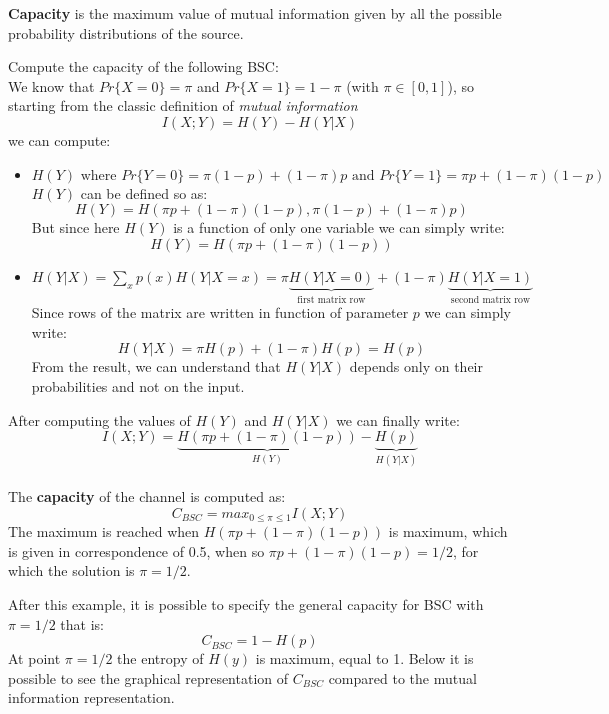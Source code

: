 \textbf{Capacity} is the maximum value of mutual information given by all the possible probability distributions of the source. 
\begin{exmp}
	Compute the capacity of the following BSC:\\
	We know that $Pr\{X=0\} = \pi$ and $Pr\{X=1\} = 1-\pi$ (with $\pi \in [0,1]$), so starting from the classic definition of \textit{mutual information} $$I(X;Y) = H(Y)-H(Y|X)$$ we can compute:
	\begin{itemize}
		\item $H(Y) \text{ where } Pr\{Y=0\} = \pi(1-p) + (1-\pi)p \text{ and } Pr\{Y=1\} = \pi p + (1-\pi)(1-p)$\\
		$H(Y)$ can be defined so as:
		$$H(Y) = H(\pi p + (1-\pi)(1-p),\pi(1-p) + (1-\pi)p )$$
		But since here $H(Y)$ is a function of only one variable we can simply write:
		$$H(Y) = H(\pi p + (1-\pi)(1-p))$$
		
		\item $H(Y|X) = \sum_x p(x) H(Y|X=x) = \pi \underbrace{H(Y|X=0)}_{\text{first matrix row}} + (1-\pi)\underbrace{H(Y|X=1)}_{\text{second matrix row}}$\\
		
		Since rows of the matrix are written in function of parameter $p$ we can simply write:
		$$H(Y|X) = \pi H(p) + (1-\pi) H(p) = H(p)$$
		From the result, we can understand that $H(Y|X)$ depends only on their probabilities and not on the input.
	\end{itemize}
	After computing the values of $H(Y)$ and $H(Y|X)$ we can finally write:
	$$I(X;Y) = \underbrace{H(\pi p + (1-\pi)(1-p))}_{H(Y)} - \underbrace{H(p)}_{H(Y|X)}$$\\
	The \textbf{capacity} of the channel is computed as:
	$$C_{BSC} = max_{0 \leq \pi \leq 1} I(X;Y)$$
	The maximum is reached when $H(\pi p + (1-\pi)(1-p))$ is maximum, which is given in correspondence of 0.5, when so $\pi p + (1-\pi)(1-p) = 1/2$, for which the solution is $\pi = 1/2$. 
\end{exmp}
After this example, it is possible to specify the general capacity for BSC with $\pi = 1/2$ that is:
$$C_{BSC} = 1-H(p)$$
At point $\pi = 1/2$ the entropy of $H(y)$ is maximum, equal to 1. 
Below it is possible to see the graphical representation of $C_{BSC}$ compared to the mutual information representation.
